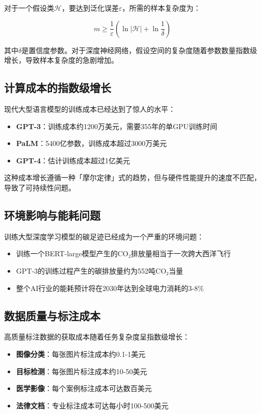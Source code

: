对于一个假设类$\mathcal{H}$，要达到泛化误差$\varepsilon$，所需的样本复杂度为：

$$m \geq \frac{1}{\varepsilon}\left(\ln|\mathcal{H}| + \ln\frac{1}{\delta}\right)$$

其中$\delta$是置信度参数。对于深度神经网络，假设空间的复杂度随着参数数量指数级增长，导致样本复杂度的急剧增加。

\subsection{计算成本的指数级增长}

现代大型语言模型的训练成本已经达到了惊人的水平：

\begin{itemize}
\item \textbf{GPT-3}：训练成本约1200万美元，需要355年的单GPU训练时间
\item \textbf{PaLM}：5400亿参数，训练成本超过3000万美元
\item \textbf{GPT-4}：估计训练成本超过1亿美元
\end{itemize}

这种成本增长遵循一种「摩尔定律」式的趋势，但与硬件性能提升的速度不匹配，导致了可持续性问题。

\subsection{环境影响与能耗问题}

训练大型深度学习模型的碳足迹已经成为一个严重的环境问题：

\begin{itemize}
\item 训练一个BERT-large模型产生的CO₂排放量相当于一次跨大西洋飞行
\item GPT-3的训练过程产生的碳排放量约为552吨CO₂当量
\item 整个AI行业的能耗预计将在2030年达到全球电力消耗的3-8\%
\end{itemize}

\subsection{数据质量与标注成本}

高质量标注数据的获取成本随着任务复杂度呈指数级增长：

\begin{itemize}
\item \textbf{图像分类}：每张图片标注成本约0.1-1美元
\item \textbf{目标检测}：每张图片标注成本约10-50美元
\item \textbf{医学影像}：每个案例标注成本可达数百美元
\item \textbf{法律文档}：专业标注成本可达每小时100-500美元
\end{itemize}

